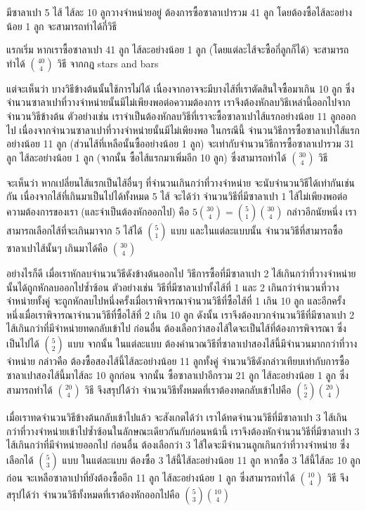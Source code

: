 \documentclass[a4paper,12pt,twoside]{article}
\begin{document}
\begin{example}
มีซาลาเปา 5 ไส้ ไส้ละ 10 ลูกวางจำหน่ายอยู่ \enskip ต้องการซื้อซาลาเปารวม 41 ลูก โดยต้องซื้อไส้ละอย่างน้อย 1 ลูก จะสามารถทำได้กี่วิธี

แรกเริ่ม หากเราซื้อซาลาเปา 41 ลูก ไส้ละอย่างน้อย 1 ลูก (โดยแต่ละไส้จะซื้อกี่ลูกก็ได้) จะสามารถทำได้ $\binom{40}{4}$ วิธี จากกฎ stars and bars

แต่จะเห็นว่า บางวิธีข้างต้นนั้นใช้การไม่ได้ เนื่องจากอาจจะมีบางไส้ที่เราตัดสินใจซื้อมาเกิน 10 ลูก ซึ่งจำนวนซาลาเปาที่วางจำหน่ายนั้นมีไม่เพียงพอต่อความต้องการ \enskip เราจึงต้องหักลบวิธีเหล่านี้ออกไปจากจำนวนวิธีข้างต้น \enskip ตัวอย่างเช่น เราจำเป็นต้องหักลบวิธีที่เราจะซื้อซาลาเปาไส้แรกอย่างน้อย 11 ลูกออกไป เนื่องจากจำนวนซาลาเปาที่วางจำหน่ายนั้นมีไม่เพียงพอ ในกรณีนี้ จำนวนวิธีการซื้อซาลาเปาไส้แรกอย่างน้อย 11 ลูก (ส่วนไส้ที่เหลือนั้นซื้ออย่างน้อย 1 ลูก) จะเท่ากับจำนวนวิธีการซื้อซาลาเปารวม 31 ลูก ไส้ละอย่างน้อย 1 ลูก (จากนั้น ซื้อไส้แรกมาเพิ่มอีก 10 ลูก) ซึ่งสามารถทำได้ $\binom{30}{4}$ วิธี

จะเห็นว่า หากเปลี่ยนไส้แรกเป็นไส้อื่นๆ ที่จำนวนเกินกว่าที่วางจำหน่าย จะนับจำนวนวิธีได้เท่ากันเช่นกัน \enskip เนื่องจากไส้ที่เกินมาเป็นไปได้ทั้งหมด 5 ไส้ จะได้ว่า จำนวนวิธีที่มีซาลาเปา 1 ไส้ไม่เพียงพอต่อความต้องการของเรา (และจำเป็นต้องหักออกไป) คือ $5\binom{30}{4}=\binom{5}{1}\binom{30}{4}$ \enskip กล่าวอีกนัยหนึ่ง เราสามารถเลือกไส้ที่จะเกินมาจาก 5 ไส้ได้ $\binom{5}{1}$ แบบ และในแต่ละแบบนั้น จำนวนวิธีที่สามารถซื้อซาลาเปาไส้นั้นๆ เกินมาได้คือ $\binom{30}{4}$

อย่างไรก็ดี เมื่อเราหักลบจำนวนวิธีดังข้างต้นออกไป วิธีการซื้อที่มีซาลาเปา 2 ไส้เกินกว่าที่วางจำหน่ายนั้นได้ถูกหักลบออกไปซ้ำซ้อน \enskip ตัวอย่างเช่น วิธีที่มีซาลาเปาทั้งไส้ที่ 1 และ 2 เกินกว่าจำนวนที่วางจำหน่ายทั้งคู่ จะถูกหักลบไปหนึ่งครั้งเมื่อเราพิจารณาจำนวนวิธีที่ซื้อไส้ที่ 1 เกิน 10 ลูก และอีกครั้งหนึ่งเมื่อเราพิจารณาจำนวนวิธีที่ซื้อไส้ที่ 2 เกิน 10 ลูก \enskip ดังนั้น เราจึงต้องบวกจำนวนวิธีที่มีซาลาเปา 2 ไส้เกินกว่าที่มีจำหน่ายทดกลับเข้าไป \enskip ก่อนอื่น ต้องเลือกว่าสองไส้ใดจะเป็นไส้ที่ต้องการพิจารณา ซึ่งเป็นไปได้ $\binom{5}{2}$ แบบ \enskip จากนั้น ในแต่ละแบบ ต้องคำนวณวิธีที่ซาลาเปาสองไส้นี้มีจำนวนมากกว่าที่วางจำหน่าย กล่าวคือ ต้องซื้อสองไส้นี้ไส้ละอย่างน้อย 11 ลูกทั้งคู่ \enskip จำนวนวิธีดังกล่าวเทียบเท่ากับการซื้อซาลาเปาสองไส้นี้มาไส้ละ 10 ลูกก่อน จากนั้น ซื้อซาลาเปาอีกรวม 21 ลูก ไส้ละอย่างน้อย 1 ลูก ซึ่งสามารถทำได้ $\binom{20}{4}$ วิธี \enskip จึงสรุปได้ว่า จำนวนวิธีทั้งหมดที่เราต้องทดกลับเข้าไปคือ $\binom{5}{2}\binom{20}{4}$

เมื่อเราทดจำนวนวิธีข้างต้นกลับเข้าไปแล้ว จะสังเกตได้ว่า เราได้ทดจำนวนวิธีที่มีซาลาเปา 3 ไส้เกินกว่าที่วางจำหน่ายเข้าไปซ้ำซ้อนในลักษณะเดียวกันกับก่อนหน้านี้ \enskip เราจึงต้องหักจำนวนวิธีที่มีซาลาเปา 3 ไส้เกินกว่าที่มีจำหน่ายออกไป \enskip ก่อนอื่น ต้องเลือกว่า 3 ไส้ใดจะมีจำนวนลูกเกินกว่าที่วางจำหน่าย ซึ่งเลือกได้ $\binom{5}{3}$ แบบ ในแต่ละแบบ ต้องซื้อ 3 ไส้นี้ไส้ละอย่างน้อย 11 ลูก \enskip หากซื้อ 3 ไส้นี้ไส้ละ 10 ลูกก่อน จะเหลือซาลาเปาที่ยังต้องซื้ออีก 11 ลูก ไส้ละอย่างน้อย 1 ลูก ซึ่งสามารถทำได้ $\binom{10}{4}$ วิธี \enskip จึงสรุปได้ว่า จำนวนวิธีทั้งหมดที่เราต้องหักออกไปคือ $\binom{5}{3}\binom{10}{4}$


\end{example}
\end{document}
